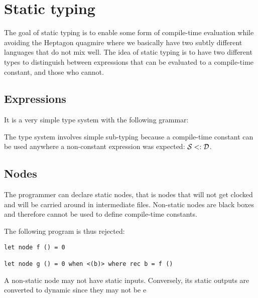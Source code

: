 \section{Static typing}

The goal of static typing is to enable some form of compile-time evaluation
while avoiding the Heptagon quagmire where we basically have two subtly
different languages that do not mix well. The idea of static typing is to have
two different types to distinguish between expressions that can be evaluated to
a compile-time constant, and those who cannot.

\subsection{Expressions}

It is a very simple type system with the following grammar:

The type system involves simple sub-typing because a compile-time constant can
be used anywhere a non-constant expression was expected: $\mathcal{S} \mathrel{<:} \mathcal{D}$.

\subsection{Nodes}

The programmer can declare static nodes, that is nodes that will not get clocked
and will be carried around in intermediate files. Non-static nodes are black
boxes and therefore cannot be used to define compile-time constants.

The following program is thus rejected:
\begin{verbatim}
let node f () = 0

let node g () = 0 when <(b)> where rec b = f ()
\end{verbatim}


A non-static node may not have static inputs. Conversely, its static outputs are
converted to dynamic since they may not be e
